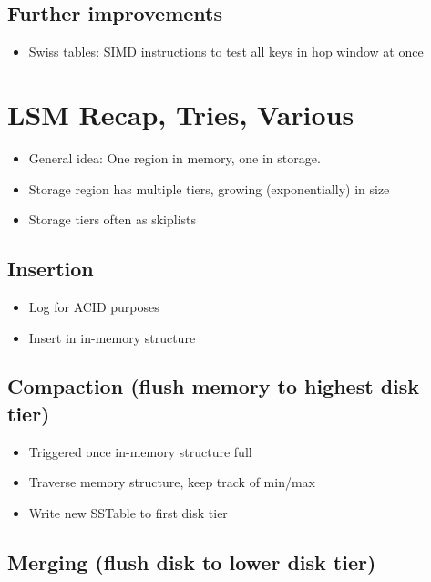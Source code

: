 \documentclass[a4paper]{scrreprt}
\begin{document}
\section{Further improvements}

\begin{itemize}
		\item Swiss tables: SIMD instructions to test all keys in hop window at
				once
\end{itemize}

\chapter{LSM Recap, Tries, Various}

\begin{itemize}
		\item General idea: One region in memory, one in storage.
		\item Storage region has multiple tiers, growing (exponentially) in size
		\item Storage tiers often as skiplists
\end{itemize}

\section{Insertion}

\begin{itemize}
		\item Log for ACID purposes
		\item Insert in in-memory structure
\end{itemize}

\section{Compaction (flush memory to highest disk tier)}

\begin{itemize}
		\item Triggered once in-memory structure full
		\item Traverse memory structure, keep track of min/max
		\item Write new SSTable to first disk tier
\end{itemize}

\section{Merging (flush disk to lower disk tier)}
\end{document}
